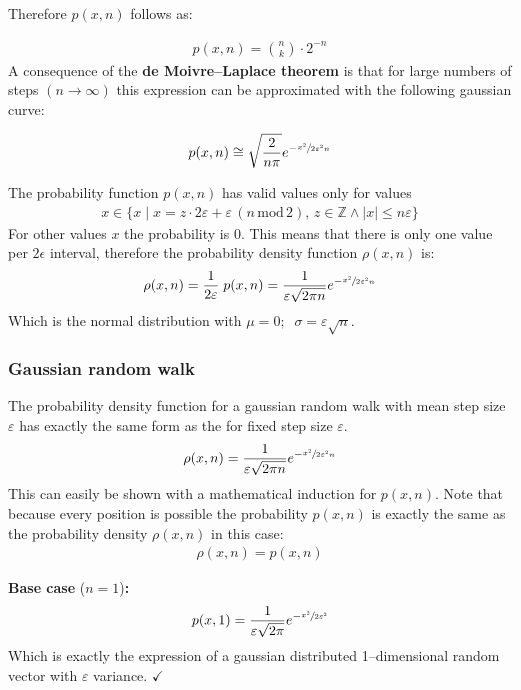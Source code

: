 \documentclass[a4paper, parskip=half]{scrartcl}
\newcommand{\effect}[1]{%
	\textbf{#1}%
}
\newcommand{\myEqLabel}[1]{\label{eq:#1}}
\begin{document}
Therefore $p(x,n)$ follows as:

\begin{align}
p(x,n) = \binom{n}{k} \cdot 2^{-n}
\end{align}
A consequence of the \effect{de Moivre–Laplace theorem} is that for large numbers of steps $(n\rightarrow\infty)$ this expression can be approximated with the following gaussian curve:

\begin{align}
p(x,n) \cong \sqrt{\frac{2}{n \pi}} e^{-\sfrac{x^2}{2\varepsilon^2 n}}
\end{align}

The probability function $p(x,n)$ has valid values only for values 
\begin{align}
x \in \{x\; |\; x = z \cdot 2 \varepsilon + \varepsilon\, (n\,\mathrm{mod}\, 2),\, z \in \mathbb{Z} \wedge |x| \leq n \varepsilon\} 
\end{align}
For other values $x$ the probability is $0$. This means that there is only one value per $2\epsilon$ interval, therefore the probability density function $\rho(x,n)$ is:
\begin{align}
\rho(x,n) = \frac{1}{2\varepsilon}\; p(x,n) = \frac{1}{\varepsilon\sqrt{2\pi n}} e^{-\sfrac{x^2}{2\varepsilon^2 n}}
\end{align}
Which is the normal distribution with $\mu = 0;\;\; \sigma =  \varepsilon\sqrt{n}$.

\subsubsection{Gaussian random walk}
The probability density function for a gaussian random walk with mean step size $\varepsilon$ has exactly the same form as the for fixed step size $\varepsilon$.
\begin{align}
\rho(x,n) = \frac{1}{\varepsilon\sqrt{2\pi n}} e^{-\sfrac{x^2}{2\varepsilon^2 n}} \myEqLabel{rho_gauss}
\end{align}
This can easily be shown with a mathematical induction for $p(x,n)$. Note that because every position is possible the probability $p(x,n)$ is exactly the same as the probability density $\rho(x,n)$ in this case:
\begin{align}
\rho(x,n) = p(x,n)
\end{align} 

\textbf{Base case} ($n = 1$)\textbf{:}
\begin{align}
p(x,1) = \frac{1}{\varepsilon\sqrt{2\pi}} e^{-\sfrac{x^2}{2\varepsilon^2}}
\end{align}
Which is exactly the expression of a gaussian distributed 1--dimensional random vector with $\varepsilon$ variance. $\checkmark$
\end{document}
